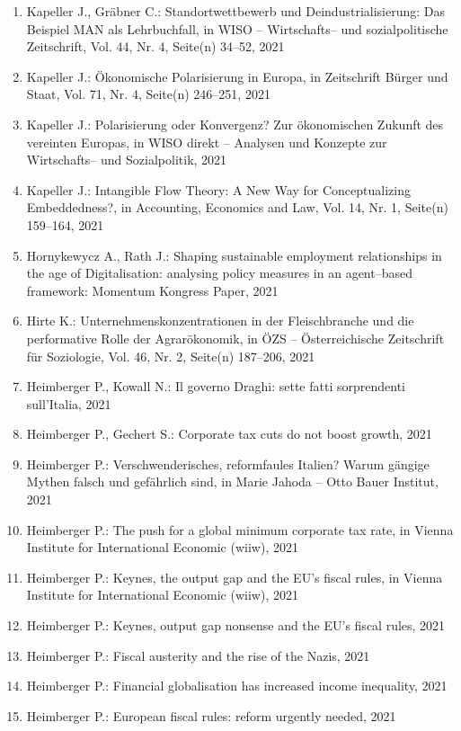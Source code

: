 \begin{enumerate}
	 \item Kapeller J., Gräbner C.: Standortwettbewerb und Deindustrialisierung: Das Beispiel MAN als Lehrbuchfall, in WISO -- Wirtschafts-- und sozialpolitische Zeitschrift, Vol. 44, Nr. 4, Seite(n) 34--52, 2021
	 \item Kapeller J.: Ökonomische Polarisierung in Europa, in Zeitschrift Bürger und Staat, Vol. 71, Nr. 4, Seite(n) 246--251, 2021
	 \item Kapeller J.: Polarisierung oder Konvergenz? Zur ökonomischen Zukunft des vereinten Europas, in WISO direkt -- Analysen und Konzepte zur Wirtschafts-- und Sozialpolitik, 2021
	 \item Kapeller J.: Intangible Flow Theory: A New Way for Conceptualizing Embeddedness?, in Accounting, Economics and Law, Vol. 14, Nr. 1, Seite(n) 159--164, 2021
	 \item Hornykewycz A., Rath J.: Shaping sustainable employment relationships in the age of Digitalisation: analysing policy measures in an agent--based framework: Momentum Kongress Paper, 2021
	 \item Hirte K.: Unternehmenskonzentrationen in der Fleischbranche und die performative Rolle der Agrarökonomik, in ÖZS -- Österreichische Zeitschrift für Soziologie, Vol. 46, Nr. 2, Seite(n) 187--206, 2021
	 \item Heimberger P., Kowall N.: Il governo Draghi: sette fatti sorprendenti sull’Italia, 2021
	 \item Heimberger P., Gechert S.: Corporate tax cuts do not boost growth, 2021
	 \item Heimberger P.: Verschwenderisches, reformfaules Italien? Warum gängige Mythen falsch und gefährlich sind, in Marie Jahoda – Otto Bauer Institut, 2021
	 \item Heimberger P.: The push for a global minimum corporate tax rate, in Vienna Institute for International Economic (wiiw), 2021
	 \item Heimberger P.: Keynes, the output gap and the EU’s fiscal rules, in Vienna Institute for International Economic (wiiw), 2021
	 \item Heimberger P.: Keynes, output gap nonsense and the EU’s fiscal rules, 2021
	 \item Heimberger P.: Fiscal austerity and the rise of the Nazis, 2021
	 \item Heimberger P.: Financial globalisation has increased income inequality, 2021
	 \item Heimberger P.: European fiscal rules: reform urgently needed, 2021

\end{enumerate}
